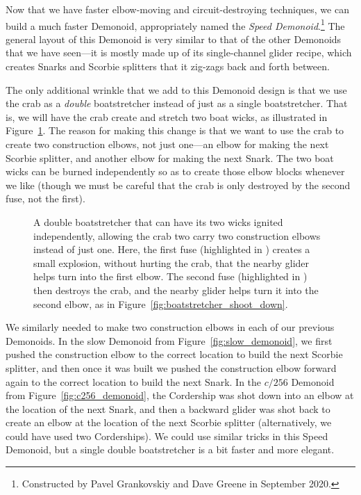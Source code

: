 Now that we have faster elbow-moving and circuit-destroying techniques, we can build a much faster Demonoid, appropriately named the \emph{Speed Demonoid}.\footnote{Constructed by Pavel Grankovskiy and Dave Greene in September 2020.} The general layout of this Demonoid is very similar to that of the other Demonoids that we have seen---it is mostly made up of its single-channel glider recipe, which creates Snarks and Scorbie splitters that it zig-zags back and forth between.

The only additional wrinkle that we add to this Demonoid design is that we use the crab as a \emph{double} boatstretcher instead of just as a single boatstretcher. That is, we will have the crab create and stretch two boat wicks, as illustrated in Figure~\ref{fig:double_boatstretcher_shoot_down}. The reason for making this change is that we want to use the crab to create two construction elbows, not just one---an elbow for making the next Scorbie splitter, and another elbow for making the next Snark. The two boat wicks can be burned independently so as to create those elbow blocks whenever we like (though we must be careful that the crab is only destroyed by the second fuse, not the first).

\begin{figure}[!htb]
	\centering
	
	\caption{A double boatstretcher that can have its two wicks ignited independently, allowing the crab two carry two construction elbows instead of just one. Here, the first fuse (highlighted in ) creates a small explosion, without hurting the crab, that the nearby glider helps turn into the first elbow. The second fuse (highlighted in ) then destroys the crab, and the nearby glider helps turn it into the second elbow, as in Figure~\ref{fig:boatstretcher_shoot_down}.}\label{fig:double_boatstretcher_shoot_down}
\end{figure}

We similarly needed to make two construction elbows in each of our previous Demonoids. In the slow Demonoid from Figure~\ref{fig:slow_demonoid}, we first pushed the construction elbow to the correct location to build the next Scorbie splitter, and then once it was built we pushed the construction elbow forward again to the correct location to build the next Snark. In the $c/256$ Demonoid from Figure~\ref{fig:c256_demonoid}, the Cordership was shot down into an elbow at the location of the next Snark, and then a backward glider was shot back to create an elbow at the location of the next Scorbie splitter (alternatively, we could have used two Corderships). We could use similar tricks in this Speed Demonoid, but a single double boatstretcher is a bit faster and more elegant.

